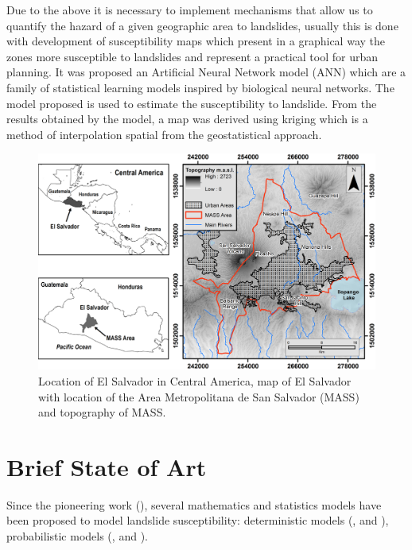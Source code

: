 \documentclass[11pt,twoside]{rmta2010esp}%
\begin{document}
Due to the above it is necessary to implement mechanisms that allow us to quantify the hazard of a given geographic area to landslides, usually this is done with development of susceptibility maps which present in a graphical way the zones more susceptible to landslides and represent a practical tool for urban planning. It was proposed an Artificial Neural Network model (ANN) which are a family of statistical learning models inspired by biological neural networks. The model proposed is used to estimate the susceptibility to landslide. From the results obtained by the model, a map was derived using kriging which is a method of interpolation spatial from the geostatistical approach. 


 \begin{center}
  \begin{figure}
   \centering
   \includegraphics[scale=0.70]{MASS_mapa_1}
   \caption{\small{Location of El Salvador in Central America, map of El Salvador with location of the Area Metropolitana de San Salvador (MASS) and topography of MASS.}}
   \label{fig:mass01}
  \end{figure}
 \end{center}




\section{Brief State of Art}
\label{sec:brief}
Since the pioneering work (\cite{Carrara1983403}), several mathematics and statistics models have been proposed to model landslide susceptibility: deterministic models (\cite{hessd-10-12643-2013},  \cite{doi:10.1080/19475705.2010.498151} and \cite{Neu2012511}), probabilistic models (\cite{Bern198839}, \cite{Chung2003451} and \cite{doi:10.1080/01431160310001618734} ). 
\end{document}
